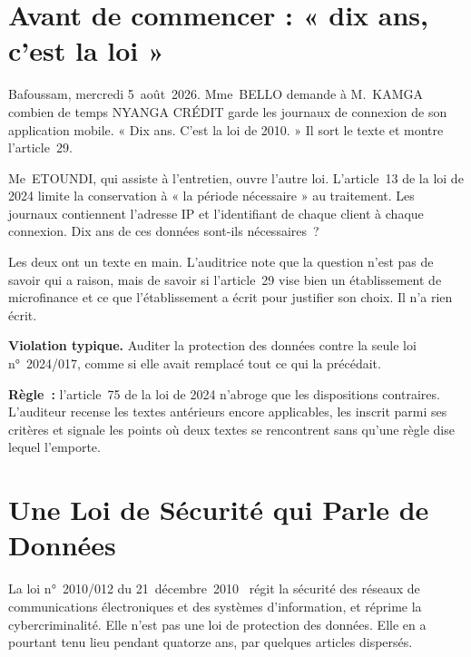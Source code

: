 \section*{Avant de commencer : « dix ans, c'est la loi »}

Bafoussam, mercredi 5~août~2026. Mme~BELLO demande à M.~KAMGA combien de
temps NYANGA CRÉDIT garde les journaux de connexion de son application
mobile. « Dix ans. C'est la loi de 2010. » Il sort le texte et montre
l'article~29.

Me~ETOUNDI, qui assiste à l'entretien, ouvre l'autre loi. L'article~13 de la
loi de 2024 limite la conservation à « la période nécessaire » au
traitement. Les journaux contiennent l'adresse IP et l'identifiant de chaque
client à chaque connexion. Dix ans de ces données sont-ils nécessaires~?

Les deux ont un texte en main. L'auditrice note que la question n'est pas de
savoir qui a raison, mais de savoir si l'article~29 vise bien un
établissement de microfinance et ce que l'établissement a écrit pour
justifier son choix. Il n'a rien écrit.

\begin{boxalert}
\textbf{Violation typique.} Auditer la protection des données contre la
seule loi n°~2024/017, comme si elle avait remplacé tout ce qui la
précédait.

\smallskip
\textbf{Règle~:} l'article~75 de la loi de 2024 n'abroge que les dispositions
contraires. L'auditeur recense les textes antérieurs encore applicables, les
inscrit parmi ses critères et signale les points où deux textes se
rencontrent sans qu'une règle dise lequel l'emporte.
\end{boxalert}

\section{Une Loi de Sécurité qui Parle de Données}
\label{sec:c07-architecture}

La loi n°~2010/012 du 21~décembre~2010~\cite{loi2010012} régit la sécurité des
réseaux de communications électroniques et des systèmes d'information, et
réprime la cybercriminalité. Elle n'est pas une loi de protection des
données. Elle en a pourtant tenu lieu pendant quatorze ans, par quelques
articles dispersés.

